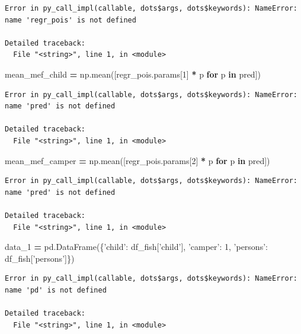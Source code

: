 \documentclass[]{book}
\newenvironment{Shaded}{\begin{snugshade}}{\end{snugshade}}
\newcommand{\ControlFlowTok}[1]{\textcolor[rgb]{0.13,0.29,0.53}{\textbf{#1}}}
\newcommand{\DecValTok}[1]{\textcolor[rgb]{0.00,0.00,0.81}{#1}}
\newcommand{\KeywordTok}[1]{\textcolor[rgb]{0.13,0.29,0.53}{\textbf{#1}}}
\newcommand{\NormalTok}[1]{#1}
\newcommand{\OperatorTok}[1]{\textcolor[rgb]{0.81,0.36,0.00}{\textbf{#1}}}
\newcommand{\StringTok}[1]{\textcolor[rgb]{0.31,0.60,0.02}{#1}}
\begin{document}
\begin{verbatim}
Error in py_call_impl(callable, dots$args, dots$keywords): NameError: name 'regr_pois' is not defined

Detailed traceback: 
  File "<string>", line 1, in <module>
\end{verbatim}

\begin{Shaded}
\begin{Highlighting}[]
\NormalTok{mean_mef_child }\OperatorTok{=}\NormalTok{ np.mean([regr_pois.params[}\DecValTok{1}\NormalTok{] }\OperatorTok{*}\NormalTok{ p }\ControlFlowTok{for}\NormalTok{ p }\KeywordTok{in}\NormalTok{ pred])}
\end{Highlighting}
\end{Shaded}

\begin{verbatim}
Error in py_call_impl(callable, dots$args, dots$keywords): NameError: name 'pred' is not defined

Detailed traceback: 
  File "<string>", line 1, in <module>
\end{verbatim}

\begin{Shaded}
\begin{Highlighting}[]
\NormalTok{mean_mef_camper }\OperatorTok{=}\NormalTok{ np.mean([regr_pois.params[}\DecValTok{2}\NormalTok{] }\OperatorTok{*}\NormalTok{ p }\ControlFlowTok{for}\NormalTok{ p }\KeywordTok{in}\NormalTok{ pred])}
\end{Highlighting}
\end{Shaded}

\begin{verbatim}
Error in py_call_impl(callable, dots$args, dots$keywords): NameError: name 'pred' is not defined

Detailed traceback: 
  File "<string>", line 1, in <module>
\end{verbatim}

\begin{Shaded}
\begin{Highlighting}[]
\NormalTok{data_1 }\OperatorTok{=}\NormalTok{ pd.DataFrame(\{}\StringTok{'child'}\NormalTok{: df_fish[}\StringTok{'child'}\NormalTok{], }\StringTok{'camper'}\NormalTok{: }\DecValTok{1}\NormalTok{, }\StringTok{'persons'}\NormalTok{: df_fish[}\StringTok{'persons'}\NormalTok{]\})}
\end{Highlighting}
\end{Shaded}

\begin{verbatim}
Error in py_call_impl(callable, dots$args, dots$keywords): NameError: name 'pd' is not defined

Detailed traceback: 
  File "<string>", line 1, in <module>
\end{verbatim}
\end{document}
